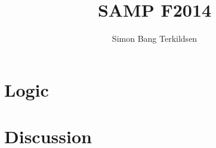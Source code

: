 \documentclass[citeauthoryear]{llncs} %
\title{SAMP F2014}
\author{Simon Bang Terkildsen}
\institute{IT University of Copenhagen}
\theoremstyle{definition}
\theoremstyle{notation}
\begin{document}
\maketitle

\begin{abstract}

\end{abstract}







\section{Logic}




\section{Discussion}



\end{document}
